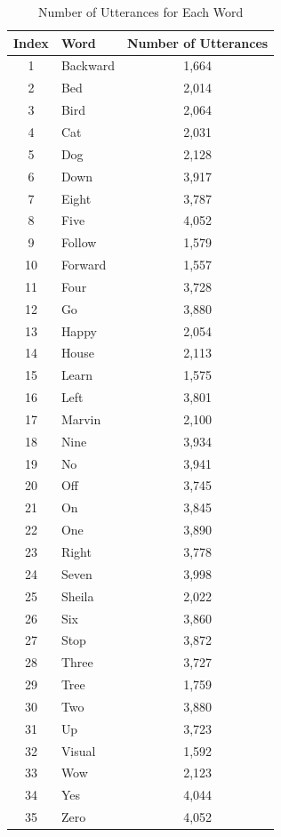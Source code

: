 \begin{table}[ht]
	\centering
	\caption{Number of Utterances for Each Word \cite{Warden:2018}}
	\label{tab:utterances}
	\begin{tabular}{clc}
		\textbf{Index} & \textbf{Word} & \textbf{Number of Utterances} \\
		\hline
		1 & Backward & 1,664 \\
		2 & Bed & 2,014 \\
		3 & Bird & 2,064 \\
		4 & Cat & 2,031 \\
		5 & Dog & 2,128 \\
		6 & Down & 3,917 \\
		7 & Eight & 3,787 \\
		8 & Five & 4,052 \\
		9 & Follow & 1,579 \\
		10 & Forward & 1,557 \\
		11 & Four & 3,728 \\
		12 & Go & 3,880 \\
		13 & Happy & 2,054 \\
		14 & House & 2,113 \\
		15 & Learn & 1,575 \\
		16 & Left & 3,801 \\
		17 & Marvin & 2,100 \\
		18 & Nine & 3,934 \\
		19 & No & 3,941 \\
		20 & Off & 3,745 \\
		21 & On & 3,845 \\
		22 & One & 3,890 \\
		23 & Right & 3,778 \\
		24 & Seven & 3,998 \\
		25 & Sheila & 2,022 \\
		26 & Six & 3,860 \\
		27 & Stop & 3,872 \\
		28 & Three & 3,727 \\
		29 & Tree & 1,759 \\
		30 & Two & 3,880 \\
		31 & Up & 3,723 \\
		32 & Visual & 1,592 \\
		33 & Wow & 2,123 \\
		34 & Yes & 4,044 \\
		35 & Zero & 4,052 \\
		\hline
	\end{tabular}
\end{table}


